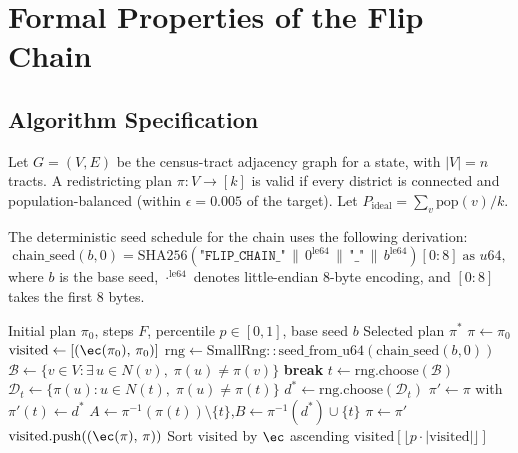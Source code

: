 \section{Formal Properties of the Flip Chain}
\label{sec:formal}

\subsection{Algorithm Specification}

Let $G = (V, E)$ be the census-tract adjacency graph for a state, with
$|V| = n$ tracts.
A redistricting plan $\pi : V \to [k]$ is valid if every district is
connected and population-balanced (within $\epsilon = 0.005$ of the target).
Let $P_{\mathrm{ideal}} = \sum_{v} \mathrm{pop}(v) / k$.

The deterministic seed schedule for the \flip{} chain uses the following
derivation:
\[
  \mathrm{chain\_seed}(b, 0)
  = \mathrm{SHA256}\!\left(\texttt{"FLIP\_CHAIN\_"} \,\|\, 0^{\mathrm{le64}}
    \,\|\, \texttt{"\_"} \,\|\, b^{\mathrm{le64}}\right)[0{:}8]
    \;\text{as } u64,
\]
where $b$ is the base seed, $\cdot^{\mathrm{le64}}$ denotes little-endian
8-byte encoding, and $[0{:}8]$ takes the first 8 bytes.

\begin{algorithm}
\caption{\flip{} Chain}
\label{alg:flip}
\begin{algorithmic}[1]
\Require Initial plan $\pi_0$, steps $F$, percentile $p \in [0,1]$,
         base seed $b$
\Ensure  Selected plan $\pi^*$
\State $\pi \gets \pi_0$
\State $\mathrm{visited} \gets [(\ec(\pi_0),\, \pi_0)]$
\State $\mathrm{rng} \gets \mathrm{SmallRng::seed\_from\_u64}(\mathrm{chain\_seed}(b, 0))$
  \State $\mathcal{B} \gets \{v \in V : \exists\, u \in N(v),\; \pi(u) \neq \pi(v)\}$
   \textbf{break} \EndIf
  \State $t \gets \mathrm{rng.choose}(\mathcal{B})$
  \State $\mathcal{D}_t \gets \{\pi(u) : u \in N(t),\; \pi(u) \neq \pi(t)\}$
  \State $d^* \gets \mathrm{rng.choose}(\mathcal{D}_t)$
  \State $\pi' \gets \pi$ with $\pi'(t) \gets d^*$
  \State $A \gets \pi^{-1}(\pi(t)) \setminus \{t\}$,\quad $B \gets \pi^{-1}(d^*) \cup \{t\}$
    \State $\pi \gets \pi'$
    \State $\mathrm{visited}.\mathrm{push}((\ec(\pi),\, \pi))$
  \EndIf
\EndFor
\State Sort $\mathrm{visited}$ by $\ec$ ascending
\State \Return $\mathrm{visited}[\lfloor p \cdot |\mathrm{visited}|\rfloor]$
\end{algorithmic}
\end{algorithm}

